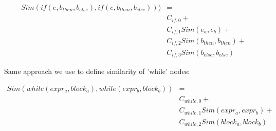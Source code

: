 \begin{align*}
	Sim(if(e, b_{then}, b_{else}), if(e, b_{then}, b_{else}))) &= \\
	&C_{if,0} + \\
	&C_{if,1} Sim(e_a, e_b) + \\
	&C_{if,2} Sim(b_{then}, b_{then}) + \\
	&C_{if,3} Sim(b_{else}, b_{else})
\end{align*}

Same approach we use to define similarity of 'while' nodes:

\begin{align*}
	Sim(while(expr_a, block_a), while(expr_b, block_b)) &= \\
	&C_{while,0} + \\
	&C_{while,1} Sim(expr_a, expr_b) + \\
	&C_{while,2} Sim(block_a, block_b)
\end{align*}




